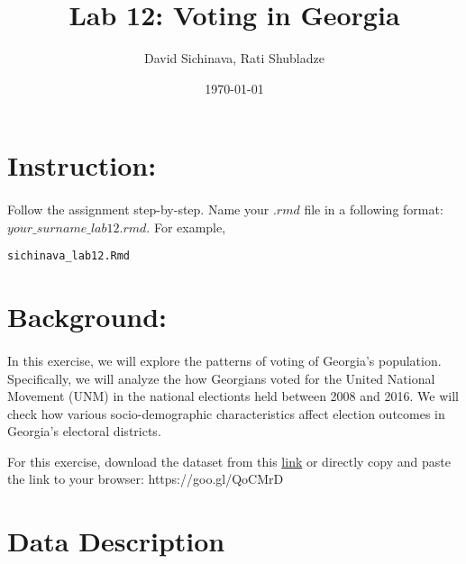 \documentclass{article}\usepackage[]{graphicx}\usepackage[]{color}
\title{Lab 12: Voting in Georgia}
\author{David Sichinava, Rati Shubladze}
\date{\today}
\makeatletter
\newcommand{\hlstd}[1]{\textcolor[rgb]{0.345,0.345,0.345}{#1}}%
\newenvironment{kframe}{%
 \def\at@end@of@kframe{}%
 \ifinner\ifhmode%
  \def\at@end@of@kframe{\end{minipage}}%
  \begin{minipage}{\columnwidth}%
 \fi\fi%
 \def\FrameCommand##1{\hskip\@totalleftmargin \hskip-\fboxsep
 \colorbox{shadecolor}{##1}\hskip-\fboxsep
     \hskip-\linewidth \hskip-\@totalleftmargin \hskip\columnwidth}%
 \MakeFramed {\advance\hsize-\width
   \@totalleftmargin\z@ \linewidth\hsize
   \@setminipage}}%
 {\par\unskip\endMakeFramed%
 \at@end@of@kframe}
\newenvironment{knitrout}{}{} %
\makeatother
\begin{document}
\maketitle

\section*{Instruction:}

\paragraph{}
Follow the assignment step-by-step. Name your $.rmd$ file in a following format: $your\_surname\_lab12.rmd$. For example,

\begin{knitrout}
\color{fgcolor}\begin{kframe}
\begin{alltt}
\hlstd{sichinava_lab12.Rmd}
\end{alltt}
\end{kframe}
\end{knitrout}

\section*{Background:}
\paragraph{}

In this exercise, we will explore the patterns of voting of Georgia's population. Specifically, we will analyze the how Georgians voted for the United National Movement (UNM) in the national electionts held between 2008 and 2016. We will check how various socio-demographic characteristics affect election outcomes in Georgia's electoral districts.

For this exercise, download the dataset from this  \href{https://goo.gl/QoCMrD}{link} or directly copy and paste the link to your browser: https://goo.gl/QoCMrD

\section*{Data Description}
\paragraph{}
\end{document}
